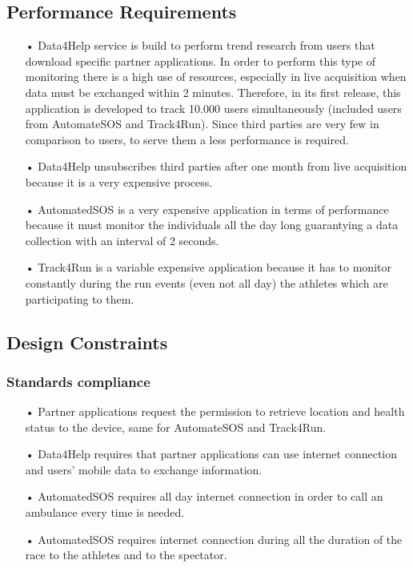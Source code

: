 \subsection{Performance Requirements}
\begin{enumerate} 
\item[•] Data4Help service is build to perform trend research from users that download specific partner applications. In order to perform this type of monitoring there is a high use of resources, especially in live acquisition when data must be exchanged within 2 minutes. Therefore, in its first release, this application is developed to track 10.000 users simultaneously (included users from AutomateSOS and Track4Run). 
Since third parties are very few in comparison to users, to serve them a less performance is required. 

\item[•] Data4Help unsubscribes third parties after one month from live acquisition because it is a very expensive process.

\item[•] AutomatedSOS is a very expensive application in terms of performance because it must monitor the individuals all the day long guarantying a data collection with an interval of 2 seconds.

\item[•] Track4Run is a variable expensive application because it has to monitor constantly during the run events (even not all day) the athletes which are participating to them.
\end{enumerate}

\subsection{Design Constraints}
\subsubsection{Standards compliance}
\begin{enumerate} 
\item[•] Partner applications request the permission to retrieve location and health status to the device, same for AutomateSOS and Track4Run.
\item[•] Data4Help requires that partner applications can use internet connection and users' mobile data to exchange information.
\item[•] AutomatedSOS requires all day internet connection in order to call an ambulance every time is needed.
\item[•] AutomatedSOS requires internet connection during all the duration of the race to the athletes and to the spectator.
\end{enumerate}

